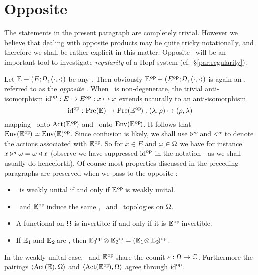 \section{Opposite \contexts}
\label{par:opposite}

The statements in the present paragraph are completely trivial.
However we believe that dealing with opposite products may be quite tricky
notationally, and therefore we shall be rather explicit in this matter.
Opposite \contexts\ will be an important tool to investigate
{\em regularity\/} of a Hopf system (cf.\ \S \ref{par:regularity}).
\vspace{2ex}


Let $\EE \equiv \EOP$ be any \context\@.
Then obviously $\EEop \equiv (E\op; \Om, \pairing)$ is again an \context,
referred to as the {\em opposite\/} \context\@.
When \EE\ is non-degenerate, the trivial anti-isomorphism
$\id\op : E \rarr E\op : x \mapsto x$
extends naturally to an anti-isomorphism
$$ \id\op : \PreE \rarr \Pre(\EEop) : (\lam,\rho) \mapsto (\rho,\lam)  $$
mapping \ActE\ onto $\Act(\EEop)$ and \EnvE\ onto $\Env(\EEop)$.
It follows that $\Env(\EEop) \simeq \EnvE\op$.
Since confusion is likely, we shall use $\lactop$ and $\ractop$
to denote the actions associated with $\EEop$.
So for $x\in E$ and $\om \in \Om$ we have for instance $x \lactop \om = \om \ract x$
(observe we have suppressed $\id\op$ in the notation---as we shall usually
do henceforth).
Of course most properties discussed in the preceding paragraphs
are preserved when we pass to the opposite \context:
\begin{itemize}
\item
   \EE\ is weakly unital if and only if $\EEop$ is weakly unital.
\item
   \EE\ and $\EEop$ induce the same \strictw, \strictm\ and \stricta\
   topologies on $\Om$.
\item
   A functional on $\Om$ is \EEdash invertible if and only if
   it is $\EEop$-invertible.
\item
   If $\EEone$ and $\EEtwo$ are \contexts, then
   $\EEone\op \tens \EEtwo\op = (\EEone \tens \EEtwo)\op$.
\end{itemize}
In the weakly unital case, \EE\ and $\EEop$ share the counit $\eps:\Om\rarr\kk$.
Furthermore the pairings $\pair{\ActE}{\Om}$ and $\pair{\Act(\EEop)}{\Om}$
agree through $\id\op$.
